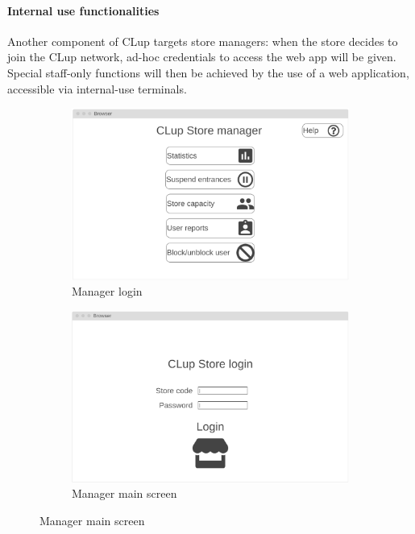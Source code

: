 \paragraph{Internal use functionalities}
Another component of CLup targets store managers: when the store decides to join the CLup network, ad-hoc credentials to access the web app will be given. Special staff-only functions will then be achieved by the use of a web application, accessible via internal-use terminals.
\begin{figure}[h!]
	\centering
	\begin{subfigure}[b]{0.7\textwidth}
		\includegraphics[width=\linewidth]{../Diagrams/WireframesCLup/ManagerMain.png}
		\caption{Manager login}
		\label{fig:WfManagerMain}
	\end{subfigure}
	\hfill
	\begin{subfigure}[b]{0.7\textwidth}
		\includegraphics[width=\linewidth]{../Diagrams/WireframesCLup/ManagerLogin.png}
		\caption{Manager main screen}
		\label{fig:WfManagerLogin}

\end{subfigure}
\end{figure}
